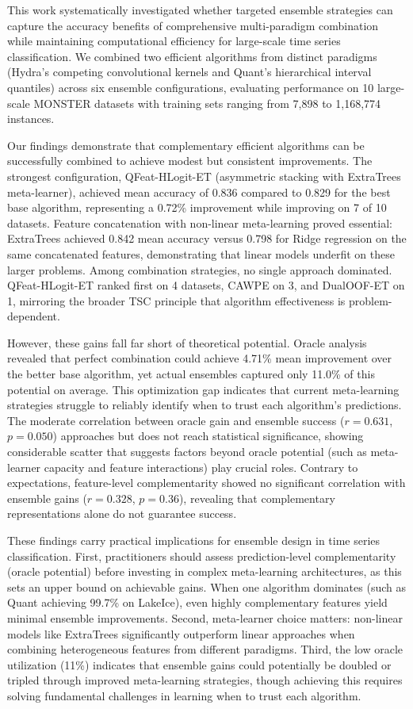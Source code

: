 \documentclass[pdflatex,sn-basic]{sn-jnl}           %
\theoremstyle{thmstyleone}%
\theoremstyle{thmstyletwo}%
\theoremstyle{thmstylethree}%
\begin{document}
This work systematically investigated whether targeted ensemble strategies can capture the accuracy benefits of comprehensive multi-paradigm combination while maintaining computational efficiency for large-scale time series classification. We combined two efficient algorithms from distinct paradigms (Hydra's competing convolutional kernels and Quant's hierarchical interval quantiles) across six ensemble configurations, evaluating performance on 10 large-scale MONSTER datasets with training sets ranging from 7,898 to 1,168,774 instances.

Our findings demonstrate that complementary efficient algorithms can be successfully combined to achieve modest but consistent improvements. The strongest configuration, QFeat-HLogit-ET (asymmetric stacking with ExtraTrees meta-learner), achieved mean accuracy of 0.836 compared to 0.829 for the best base algorithm, representing a 0.72\% improvement while improving on 7 of 10 datasets. Feature concatenation with non-linear meta-learning proved essential: ExtraTrees achieved 0.842 mean accuracy versus 0.798 for Ridge regression on the same concatenated features, demonstrating that linear models underfit on these larger problems. Among combination strategies, no single approach dominated. QFeat-HLogit-ET ranked first on 4 datasets, CAWPE on 3, and DualOOF-ET on 1, mirroring the broader TSC principle that algorithm effectiveness is problem-dependent.

However, these gains fall far short of theoretical potential. Oracle analysis revealed that perfect combination could achieve 4.71\% mean improvement over the better base algorithm, yet actual ensembles captured only 11.0\% of this potential on average. This optimization gap indicates that current meta-learning strategies struggle to reliably identify when to trust each algorithm's predictions. The moderate correlation between oracle gain and ensemble success ($r=0.631$, $p=0.050$) approaches but does not reach statistical significance, showing considerable scatter that suggests factors beyond oracle potential (such as meta-learner capacity and feature interactions) play crucial roles. Contrary to expectations, feature-level complementarity showed no significant correlation with ensemble gains ($r=0.328$, $p=0.36$), revealing that complementary representations alone do not guarantee success.

These findings carry practical implications for ensemble design in time series classification. First, practitioners should assess prediction-level complementarity (oracle potential) before investing in complex meta-learning architectures, as this sets an upper bound on achievable gains. When one algorithm dominates (such as Quant achieving 99.7\% on LakeIce), even highly complementary features yield minimal ensemble improvements. Second, meta-learner choice matters: non-linear models like ExtraTrees significantly outperform linear approaches when combining heterogeneous features from different paradigms. Third, the low oracle utilization (11\%) indicates that ensemble gains could potentially be doubled or tripled through improved meta-learning strategies, though achieving this requires solving fundamental challenges in learning when to trust each algorithm.
\end{document}
